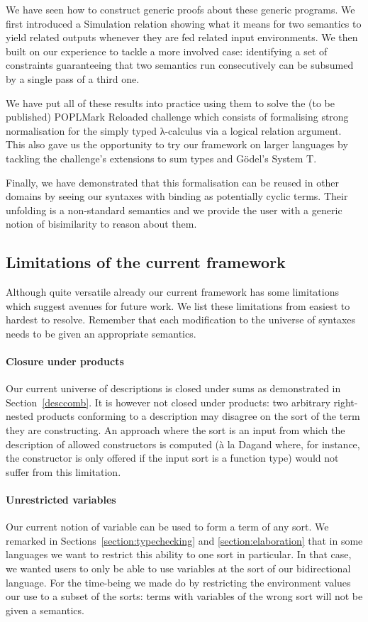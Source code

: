 We have seen how to construct generic proofs about these generic programs. We
first introduced a Simulation relation showing what it means for two semantics
to yield related outputs whenever they are fed related input environments. We
then built on our experience to tackle a more involved case: identifying a set
of constraints guaranteeing that two semantics run consecutively can be subsumed
by a single pass of a third one.

We have put all of these results into practice using them to solve the (to be
published) POPLMark Reloaded challenge which consists of formalising strong
normalisation for the simply typed λ-calculus via a logical relation
argument. This also gave us the opportunity to try our framework on larger
languages by tackling the challenge's extensions to sum types and G\"{o}del's
System T.

Finally, we have demonstrated that this formalisation can be reused
in other domains by seeing our syntaxes with binding as potentially cyclic
terms. Their unfolding is a non-standard semantics and we provide the
user with a generic notion of bisimilarity to reason about them.

\subsection{Limitations of the current framework}

Although quite versatile already our current framework has some limitations
which suggest avenues for future work. We list these limitations from easiest
to hardest to resolve. Remember that each modification to the universe of
syntaxes needs to be given an appropriate semantics.

\paragraph*{Closure under products} Our current universe of descriptions is
closed under sums as demonstrated in Section~\ref{desccomb}. It is however
not closed under products: two arbitrary right-nested products conforming
to a description may disagree on the sort of the term they are constructing.
An approach where the sort is an input from which the description of allowed
constructors is computed (à la Dagand \citeyear{DBLP:phd/ethos/Dagand13} where,
for instance, the  constructor is only offered if the input sort is
a function type) would not suffer from this limitation.

\paragraph*{Unrestricted variables} Our current notion of variable can be used
to form a term of any sort. We remarked in Sections~\ref{section:typechecking}
and \ref{section:elaboration} that in some languages we want to restrict this
ability to one sort in particular. In that case, we wanted users to only be able
to use variables at the sort  of our bidirectional language. For the
time-being we made do by restricting the environment values our 
use to a subset of the sorts: terms with variables of the wrong sort will not be
given a semantics.

